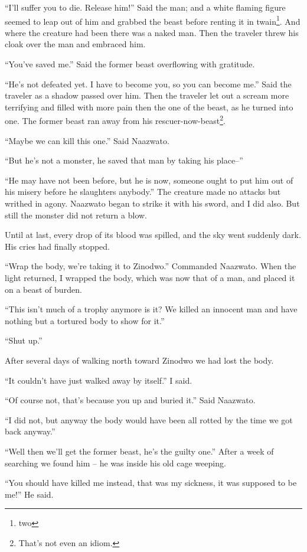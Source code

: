 ``I'll suffer you to die. Release him!'' Said the man; and a white flaming figure seemed to leap out of him and grabbed the beast before renting it in twain\footnote{two}.
And where the creature had been there was a naked man. Then the traveler threw his cloak over the man and embraced him.

``You've saved me.'' Said the former beast overflowing with gratitude. 

``He's not defeated yet. I have to become you, so you can become me.'' Said the traveler as a shadow passed over him. Then the traveler let out a scream more terrifying and filled with more pain then the one of the beast, as he turned into one. The former beast ran away from his rescuer-now-beast\footnote{That's not even an idiom.}.

``Maybe we can kill this one.'' Said Naazwato.

``But he's not a monster, he saved that man by taking his place--''

``He may have not been before, but he is now, someone ought to put him out of his misery before he slaughters anybody.''
The creature made no attacks but writhed in agony. Naazwato began to strike it with his sword, and I did also. But still the monster did not return a blow.

Until at last, every drop of its blood was spilled, and the sky went suddenly dark. His cries had finally stopped.

``Wrap the body, we're taking it to Zinodwo.'' Commanded Naazwato.
When the light returned, I wrapped the body, which was now that of a man, and placed it on a beast of burden.

``This isn't much of a trophy anymore is it? We killed an innocent man and have nothing but a tortured body to show for it.''

``Shut up.''

After several days of walking north toward Zinodwo we had lost the body.

``It couldn't have just walked away by itself.'' I said.

``Of course not, that's because you up and buried it.'' Said Naazwato.

``I did not, but anyway the body would have been all rotted by the time we got back anyway.''

``Well then we'll get the former beast, he's the guilty one.''
After a week of searching we found him -- he was inside his old cage weeping.

``You should have killed me instead, that was my sickness, it was supposed to be me!'' He said.


